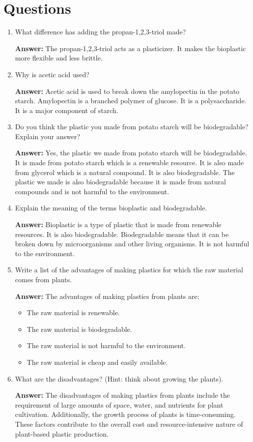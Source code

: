 \documentclass[a4paper, 12pt, english]{article}
\begin{document}
\section{Questions}
\begin{enumerate}
	\item What difference has adding the propan-1,2,3-triol made?

	      \textbf{Answer:} The propan-1,2,3-triol acts as a plasticizer. It makes the
	      bioplastic more flexible and less brittle.

	\item Why is acetic acid used?

	      \textbf{Answer:} Acetic acid is used to break down the amylopectin in the
	      potato starch. Amylopectin is a branched polymer of glucose. It is a
	      polysaccharide. It is a major component of starch.

	\item Do you think the plastic you made from potato starch will be biodegradable?
	      Explain your answer?

	      \textbf{Answer:} Yes, the plastic we made from potato starch will be
	      biodegradable. It is made from potato starch which is a renewable resource.
	      It is also made from glycerol which is a natural compound. It is also
	      biodegradable. The plastic we made is also biodegradable because it is made
	      from natural compounds and is not harmful to the environment.

	\item Explain the meaning of the terms bioplastic and biodegradable.

	      \textbf{Answer:} Bioplastic is a type of plastic that is made from renewable
	      resources. It is also biodegradable. Biodegradable means that it can be
	      broken down by microorganisms and other living organisms. It is not harmful to
	      the environment.

	\item Write a list of the advantages of making plastics for which the raw material
	      comes from plants.

	      \textbf{Answer:} The advantages of making plastics from plants are:
	      \begin{itemize}
		      \item The raw material is renewable.
		      \item The raw material is biodegradable.
		      \item The raw material is not harmful to the environment.
		      \item The raw material is cheap and easily available.
	      \end{itemize}

	\item What are the disadvantages? (Hint: think about growing the plants).

	      \textbf{Answer:} The disadvantages of making plastics from plants include the requirement of large amounts of space, water, and nutrients for plant cultivation. Additionally, the growth process of plants is time-consuming. These factors contribute to the overall cost and resource-intensive nature of plant-based plastic production.
\end{enumerate}
\end{document}
